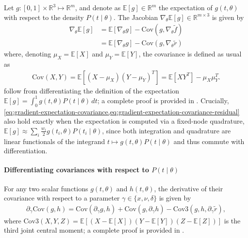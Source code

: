 \documentclass{article}
\begin{document}
Let $g : [0, 1] \times \mathbb{R}^3 \mapsto \mathbb{R}^m$, and denote as $\mathbb{E}[g] \in \mathbb{R}^m$ the expectation of $g(t, \theta)$ with respect to the density $P(t \mid \theta)$.
The Jacobian $\nabla_\theta \mathbb{E}[g] \in \mathbb{R}^{m \times 3}$ is given by
%
\begin{align}
  \nabla_\theta \mathbb{E}[g] & = \mathbb{E}[\nabla_\theta g] - \mathrm{Cov}(g, \nabla_\theta \tilde{f}) \label{eq:gradient-expectation-covariance}          \\
                              & = \mathbb{E}[\nabla_\theta g] - \mathrm{Cov}(g, \nabla_\theta \tilde{r}) \label{eq:gradient-expectation-covariance-residual}
\end{align}
%
where, denoting $\mu_X = \mathbb{E}[X]$ and $\mu_Y = \mathbb{E}[Y]$, the covariance is defined as usual as
%
\begin{align}
  \mathrm{Cov}(X, Y) = \mathbb{E}[(X - \mu_X)(Y - \mu_Y)^T] = \mathbb{E}[X Y^T] - \mu_X \mu_Y^T.
\end{align}
%
 follow from differentiating the definition of the expectation $\mathbb{E}[g] = \int_0^1 g(t, \theta) P(t \mid \theta) \, dt$;
a complete proof is provided in .
Crucially, \cref{eq:gradient-expectation-covariance,eq:gradient-expectation-covariance-residual} also hold exactly when the expectation is computed via a fixed-node quadrature, $\mathbb{E}[g] \approx \sum_i \frac{w_i}{2} g(t_i, \theta) P(t_i \mid \theta)$, since both integration and quadrature are linear functionals of the integrand $t \mapsto g(t,\theta) P(t \mid \theta)$ and thus commute with differentiation.

\paragraph{Differentiating covariances with respect to $P(t \mid \theta)$}\label{sec:derivative-covariance}

For any two scalar functions $g(t,\theta)$ and $h(t,\theta)$, the derivative of their covariance with respect to a parameter $\gamma \in \{x, \nu, \delta\}$ is given by
%
\begin{align}\label{eq:derivative-covariance-identity}
  \partial_{\gamma} \mathrm{Cov}(g, h) = \mathrm{Cov}(\partial_{\gamma} g, h) + \mathrm{Cov}(g, \partial_{\gamma} h) - \mathrm{Cov3}(g, h, \partial_{\gamma} \tilde{r}),
\end{align}
%
where $\mathrm{Cov3}(X,Y,Z) = \mathbb{E}[(X-\mathbb{E}[X])(Y-\mathbb{E}[Y])(Z-\mathbb{E}[Z])]$ is the third joint central moment;
a complete proof is provided in .
\end{document}
